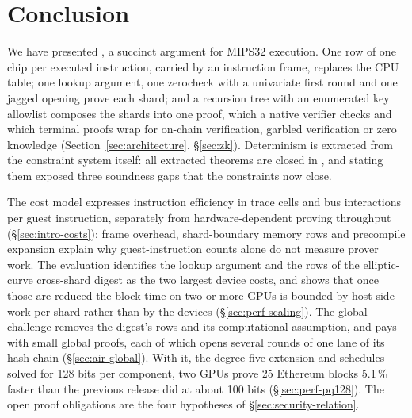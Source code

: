 \section{Conclusion}
\label{sec:conclusion}

We have presented \Ziren{}, a succinct argument for MIPS32 execution. One row of one chip per executed instruction, carried by an instruction frame, replaces the CPU table; one lookup argument, one zerocheck with a univariate first round and one jagged \WHIR{} opening prove each shard; and a recursion tree with an enumerated key allowlist composes the shards into one proof, which a native verifier checks and which terminal proofs wrap for on-chain verification, garbled verification or zero knowledge (Section~\ref{sec:architecture}, \S\ref{sec:zk}). Determinism is extracted from the constraint system itself: all \ndettotal{} extracted theorems are closed in \Lean{}, and stating them exposed three soundness gaps that the constraints now close.

The cost model expresses instruction efficiency in trace cells and bus interactions per guest instruction, separately from hardware-dependent proving throughput (\S\ref{sec:intro-costs}); frame overhead, shard-boundary memory rows and precompile expansion explain why guest-instruction counts alone do not measure prover work. The evaluation identifies the lookup argument and the rows of the elliptic-curve cross-shard digest as the two largest device costs, and shows that once those are reduced the block time on two or more GPUs is bounded by host-side work per shard rather than by the devices (\S\ref{sec:perf-scaling}). The global challenge removes the digest's rows and its computational assumption, and pays with small global proofs, each of which opens several rounds of one lane of its hash chain (\S\ref{sec:air-global}). With it, the degree-five extension and schedules solved for 128 bits per component, two GPUs prove 25 Ethereum blocks 5.1\,\% faster than the previous release did at about 100 bits (\S\ref{sec:perf-pq128}). The open proof obligations are the four hypotheses of \S\ref{sec:security-relation}.
